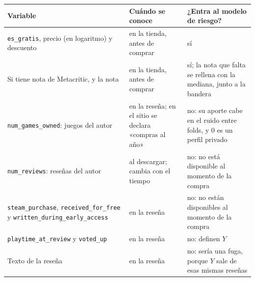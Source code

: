 \begin{tabularx}{\textwidth}{>{\raggedright\arraybackslash}X >{\raggedright\arraybackslash}p{4.2cm} >{\raggedright\arraybackslash}p{4.6cm}}
\toprule
Variable & Cuándo se conoce & ¿Entra al modelo de riesgo? \\
\midrule
\texttt{es\_gratis}, precio (en logaritmo) y descuento & en la tienda, antes de comprar & sí \\
Si tiene nota de Metacritic, y la nota & en la tienda, antes de comprar & sí; la nota que falta se rellena con la mediana, junto a la bandera \\
\texttt{num\_games\_owned}: juegos del autor & en la reseña; en el sitio se declara «compras al año» & no: su aporte cabe en el ruido entre folds, y 0 es un perfil privado \\
\texttt{num\_reviews}: reseñas del autor & al descargar; cambia con el tiempo & no: no está disponible al momento de la compra \\
\texttt{steam\_purchase}, \texttt{received\_for\_free} y \texttt{written\_during\_early\_access} & en la reseña & no: no están disponibles al momento de la compra \\
\texttt{playtime\_at\_review} y \texttt{voted\_up} & en la reseña & no: definen $Y$ \\
Texto de la reseña & en la reseña & no: sería una fuga, porque $Y$ sale de esas mismas reseñas \\
\bottomrule
\end{tabularx}
